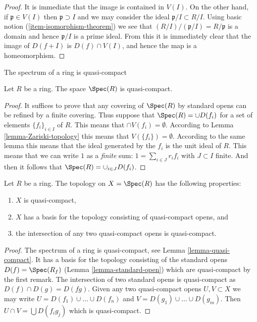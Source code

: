 \begin{proof}
It is immediate that the image is contained in $V(I)$.
On the other hand, if $\mathfrak p \in V(I)$
then $\mathfrak p \supset I$ and we may consider
the ideal $\mathfrak p /I \subset R/I$. Using
basic notion (\ref{item-isomorphism-theorem}) we see that
$(R/I)/(\mathfrak p/I) = R/\mathfrak p$ is a domain
and hence $\mathfrak p/I$ is a prime ideal. From this
it is immediately clear that the image of $D(f + I)$
is $D(f) \cap V(I)$, and hence the map is a homeomorphism.
\end{proof}



\begin{lemma}
\label{lemma-quasi-compact}
\begin{slogan}
The spectrum of a ring is quasi-compact
\end{slogan}
Let $R$ be a ring. The space $\Spec(R)$ is quasi-compact.
\end{lemma}

\begin{proof}
It suffices to prove that any covering of $\Spec(R)$
by standard opens can be refined by a finite covering.
Thus suppose that $\Spec(R) = \cup D(f_i)$
for a set of elements $\{f_i\}_{i\in I}$ of $R$. This means that
$\cap V(f_i) = \emptyset$. According to Lemma
\ref{lemma-Zariski-topology} this means that
$V(\{f_i \}) = \emptyset$. According to the
same lemma this means that the ideal generated
by the $f_i$ is the unit ideal of $R$. This means
that we can write $1$ as a {\it finite} sum:
$1 = \sum_{i \in J} r_i f_i$ with $J \subset I$ finite.
And then it follows that $\Spec(R)
= \cup_{i \in J} D(f_i)$.
\end{proof}

\begin{lemma}
\label{lemma-topology-spec}
Let $R$ be a ring.
The topology on $X = \Spec(R)$ has the following properties:
\begin{enumerate}
\item $X$ is quasi-compact,
\item $X$ has a basis for the topology consisting of quasi-compact opens, and
\item the intersection of any two quasi-compact opens is quasi-compact.
\end{enumerate}
\end{lemma}

\begin{proof}
The spectrum of a ring is quasi-compact, see
Lemma \ref{lemma-quasi-compact}.
It has a basis for the topology consisting of the standard opens
$D(f) = \Spec(R_f)$
(Lemma \ref{lemma-standard-open})
which are quasi-compact by the first remark.
The intersection of two standard opens is quasi-compact
as $D(f) \cap D(g) = D(fg)$. Given any two quasi-compact opens
$U, V \subset X$ we may write $U = D(f_1) \cup \ldots \cup D(f_n)$
and $V = D(g_1) \cup \ldots \cup D(g_m)$. Then
$U \cap V = \bigcup D(f_ig_j)$ which is quasi-compact.
\end{proof}






